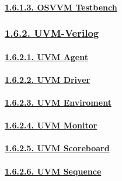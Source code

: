 \documentclass[
]{article}
\begin{document}
\hypertarget{osvvm-testbench}{%
\paragraph{\texorpdfstring{\protect\hyperlink{osvvm-testbench-1}{1.6.1.3.
OSVVM Testbench}}{1.6.1.3. OSVVM Testbench}}\label{osvvm-testbench}}

\hypertarget{uvm-verilog}{%
\subsubsection{\texorpdfstring{\protect\hyperlink{uvm-verilog-1}{1.6.2.
UVM-Verilog}}{1.6.2. UVM-Verilog}}\label{uvm-verilog}}

\hypertarget{uvm-agent}{%
\paragraph{\texorpdfstring{\protect\hyperlink{uvm-agent-1}{1.6.2.1. UVM
Agent}}{1.6.2.1. UVM Agent}}\label{uvm-agent}}

\hypertarget{uvm-driver}{%
\paragraph{\texorpdfstring{\protect\hyperlink{uvm-driver-1}{1.6.2.2. UVM
Driver}}{1.6.2.2. UVM Driver}}\label{uvm-driver}}

\hypertarget{uvm-enviroment}{%
\paragraph{\texorpdfstring{\protect\hyperlink{uvm-enviroment-1}{1.6.2.3.
UVM Enviroment}}{1.6.2.3. UVM Enviroment}}\label{uvm-enviroment}}

\hypertarget{uvm-monitor}{%
\paragraph{\texorpdfstring{\protect\hyperlink{uvm-monitor-1}{1.6.2.4.
UVM Monitor}}{1.6.2.4. UVM Monitor}}\label{uvm-monitor}}

\hypertarget{uvm-scoreboard}{%
\paragraph{\texorpdfstring{\protect\hyperlink{uvm-scoreboard-1}{1.6.2.5.
UVM Scoreboard}}{1.6.2.5. UVM Scoreboard}}\label{uvm-scoreboard}}

\hypertarget{uvm-sequence}{%
\paragraph{\texorpdfstring{\protect\hyperlink{uvm-sequence-1}{1.6.2.6.
UVM Sequence}}{1.6.2.6. UVM Sequence}}\label{uvm-sequence}}
\end{document}
